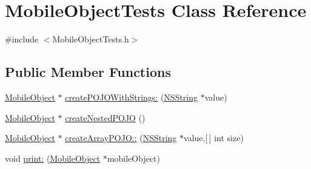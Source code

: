 \hypertarget{interface_mobile_object_tests}{
\section{\-Mobile\-Object\-Tests \-Class \-Reference}
\label{interface_mobile_object_tests}
}


{\ttfamily \#include $<$\-Mobile\-Object\-Tests.\-h$>$}

\subsection*{\-Public \-Member \-Functions}
\begin{DoxyCompactItemize}
\item 
\hyperlink{interface_mobile_object}{\-Mobile\-Object} $\ast$ \hyperlink{interface_mobile_object_tests_aa9dded2e3a6b4424cbd7957ce4cdb321}{create\-P\-O\-J\-O\-With\-Strings\-:} (\hyperlink{class_n_s_string}{\-N\-S\-String} $\ast$value)
\item 
\hyperlink{interface_mobile_object}{\-Mobile\-Object} $\ast$ \hyperlink{interface_mobile_object_tests_a4cce7f586ae886bd62af46d3d8e77c11}{create\-Nested\-P\-O\-J\-O} ()
\item 
\hyperlink{interface_mobile_object}{\-Mobile\-Object} $\ast$ \hyperlink{interface_mobile_object_tests_aa52beba959731f89c9746f648623cccc}{create\-Array\-P\-O\-J\-O\-::} (\hyperlink{class_n_s_string}{\-N\-S\-String} $\ast$value,\mbox{[}$\,$\mbox{]} int size)
\item 
void \hyperlink{interface_mobile_object_tests_a44f161c9cd4e4392a64e8644be645f1a}{print\-:} (\hyperlink{interface_mobile_object}{\-Mobile\-Object} $\ast$mobile\-Object)
\end{DoxyCompactItemize}


